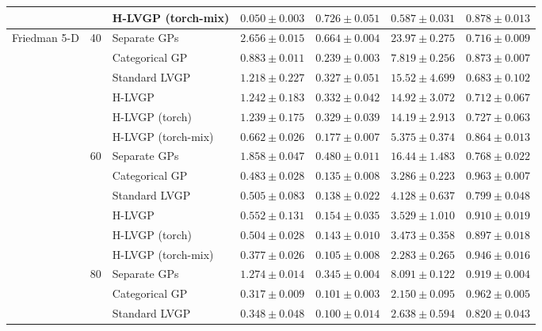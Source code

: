 \begin{table}[htbp]
\begin{tabular}{lllrrrr}
 &  & H-LVGP (torch-mix) & $0.050 \pm 0.003$ & $0.726 \pm 0.051$ & \colorbox{green!20}{\boldmath$0.587 \pm 0.031$} & $0.878 \pm 0.013$ \\
\midrule
\multirow{18}{*}{Friedman 5-D} & \multirow{6}{*}{40} & Separate GPs & $2.656 \pm 0.015$ & $0.664 \pm 0.004$ & $23.97 \pm 0.275$ & $0.716 \pm 0.009$ \\
 &  & Categorical GP & $0.883 \pm 0.011$ & $0.239 \pm 0.003$ & $7.819 \pm 0.256$ & \colorbox{green!20}{\boldmath$0.873 \pm 0.007$} \\
 &  & Standard LVGP & $1.218 \pm 0.227$ & $0.327 \pm 0.051$ & $15.52 \pm 4.699$ & $0.683 \pm 0.102$ \\
 &  & H-LVGP & $1.242 \pm 0.183$ & $0.332 \pm 0.042$ & $14.92 \pm 3.072$ & $0.712 \pm 0.067$ \\
 &  & H-LVGP (torch) & $1.239 \pm 0.175$ & $0.329 \pm 0.039$ & $14.19 \pm 2.913$ & $0.727 \pm 0.063$ \\
 &  & H-LVGP (torch-mix) & \colorbox{green!20}{\boldmath$0.662 \pm 0.026$} & \colorbox{green!20}{\boldmath$0.177 \pm 0.007$} & \colorbox{green!20}{\boldmath$5.375 \pm 0.374$} & $0.864 \pm 0.013$ \\
\cmidrule(lr){2-7}
 & \multirow{6}{*}{60} & Separate GPs & $1.858 \pm 0.047$ & $0.480 \pm 0.011$ & $16.44 \pm 1.483$ & $0.768 \pm 0.022$ \\
 &  & Categorical GP & $0.483 \pm 0.028$ & $0.135 \pm 0.008$ & $3.286 \pm 0.223$ & $0.963 \pm 0.007$ \\
 &  & Standard LVGP & $0.505 \pm 0.083$ & $0.138 \pm 0.022$ & $4.128 \pm 0.637$ & $0.799 \pm 0.048$ \\
 &  & H-LVGP & $0.552 \pm 0.131$ & $0.154 \pm 0.035$ & $3.529 \pm 1.010$ & $0.910 \pm 0.019$ \\
 &  & H-LVGP (torch) & $0.504 \pm 0.028$ & $0.143 \pm 0.010$ & $3.473 \pm 0.358$ & $0.897 \pm 0.018$ \\
 &  & H-LVGP (torch-mix) & \colorbox{green!20}{\boldmath$0.377 \pm 0.026$} & \colorbox{green!20}{\boldmath$0.105 \pm 0.008$} & \colorbox{green!20}{\boldmath$2.283 \pm 0.265$} & \colorbox{green!20}{\boldmath$0.946 \pm 0.016$} \\
\cmidrule(lr){2-7}
 & \multirow{6}{*}{80} & Separate GPs & $1.274 \pm 0.014$ & $0.345 \pm 0.004$ & $8.091 \pm 0.122$ & $0.919 \pm 0.004$ \\
 &  & Categorical GP & $0.317 \pm 0.009$ & $0.101 \pm 0.003$ & $2.150 \pm 0.095$ & $0.962 \pm 0.005$ \\
 &  & Standard LVGP & $0.348 \pm 0.048$ & $0.100 \pm 0.014$ & $2.638 \pm 0.594$ & $0.820 \pm 0.043$ \\

\end{tabular}
\end{table}
